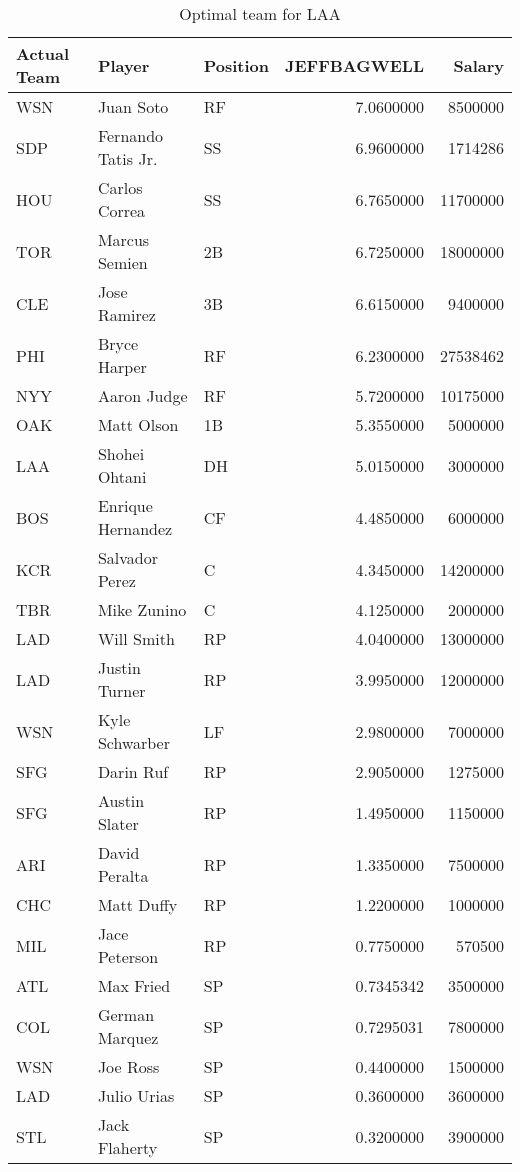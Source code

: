\begin{table}

\caption{Optimal team for LAA}
\centering
\begin{tabular}[t]{l|l|l|r|r}
\hline
Actual Team & Player & Position & JEFFBAGWELL & Salary\\
\hline
WSN & Juan Soto & RF & 7.0600000 & 8500000\\
\hline
SDP & Fernando Tatis Jr. & SS & 6.9600000 & 1714286\\
\hline
HOU & Carlos Correa & SS & 6.7650000 & 11700000\\
\hline
TOR & Marcus Semien & 2B & 6.7250000 & 18000000\\
\hline
CLE & Jose Ramirez & 3B & 6.6150000 & 9400000\\
\hline
PHI & Bryce Harper & RF & 6.2300000 & 27538462\\
\hline
NYY & Aaron Judge & RF & 5.7200000 & 10175000\\
\hline
OAK & Matt Olson & 1B & 5.3550000 & 5000000\\
\hline
LAA & Shohei Ohtani & DH & 5.0150000 & 3000000\\
\hline
BOS & Enrique Hernandez & CF & 4.4850000 & 6000000\\
\hline
KCR & Salvador Perez & C & 4.3450000 & 14200000\\
\hline
TBR & Mike Zunino & C & 4.1250000 & 2000000\\
\hline
LAD & Will Smith & RP & 4.0400000 & 13000000\\
\hline
LAD & Justin Turner & RP & 3.9950000 & 12000000\\
\hline
WSN & Kyle Schwarber & LF & 2.9800000 & 7000000\\
\hline
SFG & Darin Ruf & RP & 2.9050000 & 1275000\\
\hline
SFG & Austin Slater & RP & 1.4950000 & 1150000\\
\hline
ARI & David Peralta & RP & 1.3350000 & 7500000\\
\hline
CHC & Matt Duffy & RP & 1.2200000 & 1000000\\
\hline
MIL & Jace Peterson & RP & 0.7750000 & 570500\\
\hline
ATL & Max Fried & SP & 0.7345342 & 3500000\\
\hline
COL & German Marquez & SP & 0.7295031 & 7800000\\
\hline
WSN & Joe Ross & SP & 0.4400000 & 1500000\\
\hline
LAD & Julio Urias & SP & 0.3600000 & 3600000\\
\hline
STL & Jack Flaherty & SP & 0.3200000 & 3900000\\
\hline
\end{tabular}
\end{table}
